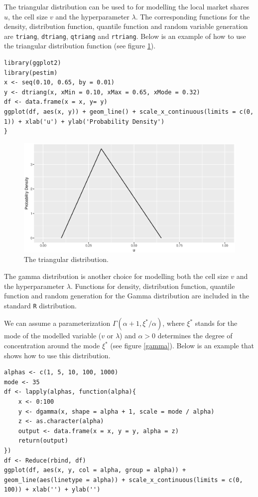 \documentclass[12pt, a4paper]{article}
\begin{document}
The triangular distribution can be used to for modelling the local market shares $u$, 
the cell size $v$ and the hyperparameter $\lambda$. The corresponding functions for 
the density, distribution function, quantile function and random variable generation
are \texttt{triang}, \texttt{dtriang}, \texttt{qtriang} and \texttt{rtriang}.
Below is an example of how to use the triangular distribution function (see figure \ref{triang}).

\begin{verbatim}
library(ggplot2)
library(pestim)
x <- seq(0.10, 0.65, by = 0.01)
y <- dtriang(x, xMin = 0.10, xMax = 0.65, xMode = 0.32)
df <- data.frame(x = x, y= y)
ggplot(df, aes(x, y)) + geom_line() + scale_x_continuous(limits = c(0, 1)) + xlab('u') + ylab('Probability Density')	
}
\end{verbatim}

\begin{figure}
	\centering
	\includegraphics[scale=0.75]{triang.eps}
	\caption{The triangular distribution.}
	\label{triang}
\end{figure}

The gamma distribution is another choice for modelling both the cell size $v$ and the hyperparameter $\lambda$.
Functions for density, distribution function, quantile function and random generation for the Gamma distribution 
are included in the standard \texttt{R} distribution.

We can assume a parameterization $\Gamma(\alpha + 1, \xi^{*} / \alpha)$, where $\xi^{*}$ stands for the mode of the 
modelled variable ($v$ or $\lambda$) and $\alpha> 0$ determines the degree of concentration 
around the mode $\xi^{*}$ (see figure \ref{gamma}).
Below is an example that shows how to use this distribution.

\begin{verbatim}
alphas <- c(1, 5, 10, 100, 1000)
mode <- 35
df <- lapply(alphas, function(alpha){
    x <- 0:100
    y <- dgamma(x, shape = alpha + 1, scale = mode / alpha)
    z <- as.character(alpha)
    output <- data.frame(x = x, y = y, alpha = z)
    return(output)
})
df <- Reduce(rbind, df)
ggplot(df, aes(x, y, col = alpha, group = alpha)) + geom_line(aes(linetype = alpha)) + scale_x_continuous(limits = c(0, 100)) + xlab('') + ylab('')
\end{verbatim}
\end{document}
